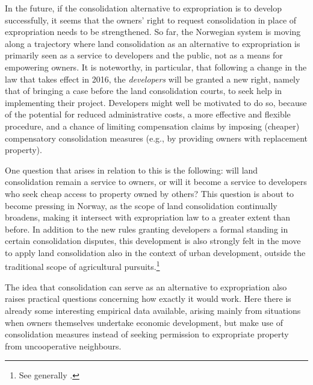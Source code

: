 In the future, if the consolidation alternative to expropriation is to develop successfully, it seems that the owners' right to request consolidation in place of expropriation needs to be strengthened. So far, the Norwegian system is moving along a trajectory where land consolidation as an alternative to expropriation is primarily seen as a service to developers and the public, not as a means for empowering owners. It is noteworthy, in particular, that following a change in the law that takes effect in 2016, the {\it developers} will be granted a new right, namely that of bringing a case before the land consolidation courts, to seek help in implementing their project. Developers might well be motivated to do so, because of the potential for reduced administrative costs, a more effective and flexible procedure, and a chance of limiting compensation claims by imposing (cheaper) compensatory consolidation measures (e.g., by providing owners with replacement property).

One question that arises in relation to this is the following: will land consolidation remain a service to owners, or will it become a service to developers who seek cheap access to property owned by others? This question is about to become pressing in Norway, as the scope of land consolidation continually broadens, making it intersect with expropriation law to a greater extent than before. In addition to the new rules granting developers a formal standing in certain consolidation disputes, this development is also strongly felt in the move to apply land consolidation also in the context of urban development, outside the traditional scope of agricultural pursuits.\footnote{See generally \cite{stenseth07}.}


The idea that consolidation can serve as an alternative to expropriation also raises practical questions concerning how exactly it would work. Here there is already some interesting empirical data available, arising mainly from situations when owners themselves undertake economic development, but make use of consolidation measures instead of seeking permission to expropriate property from uncooperative neighbours.

